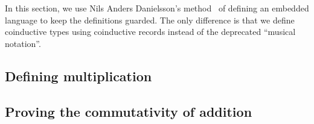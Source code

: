 In this section, we use Nils Anders Danielsson's
method~\cite{danielsson-beating} of defining an embedded language to keep the
definitions guarded. The only difference is that we define coinductive types
using coinductive records instead of the deprecated ``musical notation''.

\subsection{Defining multiplication}\label{sec:dsl-mul}


\subsection{Proving the commutativity of addition}\label{sec:dsl-comm}



